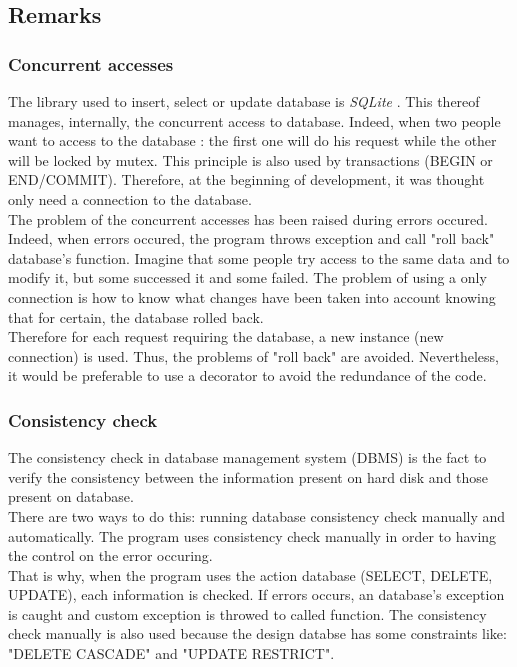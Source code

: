 \subsection{Remarks}
\subsubsection{Concurrent accesses}
\setlength{\parindent}{1cm}
\hspace{1cm}
The library used to insert, select or update database is
\emph{SQLite} \cite{SQLite}. This thereof manages, internally,
the concurrent access to database. Indeed, when two people want to
access to the database : the first one will do his request while
the other will be locked by mutex. This principle is also used by transactions
(BEGIN or END/COMMIT).
Therefore, at the beginning of development, it was thought only need a
connection to the database.\\
The problem of the concurrent accesses has been raised during errors occured.
Indeed, when errors occured, the program throws exception and call "roll back"
database's function. Imagine that some people try access to the same data and to
modify it, but some successed it and some failed. The problem of using a only
connection is how to know what changes have been taken into account knowing
that for certain, the database rolled back.\\
Therefore for each request requiring the database,
a new instance (new connection) is used. Thus, the problems
of "roll back" are avoided. Nevertheless, it would be preferable to use a decorator
to avoid the redundance of the code.

\subsubsection{Consistency check}

The consistency check in database management system (DBMS) is the fact
to verify the consistency between the information present on hard disk and
those present on database.\\
There are two ways to do this: running database consistency check manually and
automatically. The program uses consistency check manually in order to
having the control on the error occuring.\\
That is why, when the program uses the action database (SELECT, DELETE, UPDATE),
each information is checked. If errors occurs, an database's exception is caught
and custom exception is throwed to called function.
The consistency check manually is also used because the design databse
has some constraints like: "DELETE CASCADE" and "UPDATE RESTRICT".

